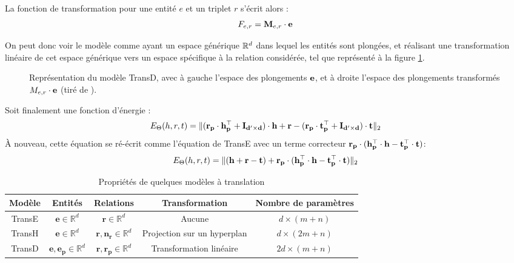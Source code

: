 La fonction de transformation pour une entité $e$ et un triplet $r$ s'écrit alors :
\begin{equation}
    \label{eq:kge-transd-function}
    F_{e, r} = \bf{M}_{e, r} \cdot \bf{e}
\end{equation}

On peut donc voir le modèle comme ayant un espace générique $\R^d$ dans lequel les entités sont plongées, et réalisant une transformation linéaire de cet espace générique vers un espace spécifique à la relation considérée, tel que représenté à la figure \ref{fig:transd-schema}.

\begin{figure}[h]
    \centering
    
    \caption[Principe du modèle TransD]{Représentation du modèle TransD, avec à gauche l'espace des plongements $\bf{e}$, et à droite l'espace des plongements transformés $M_{e, r} \cdot \bf{e}$ (tiré de \cite{transd}).}
    \label{fig:transd-schema}
\end{figure}

Soit finalement une fonction d'énergie :
\begin{equation}
    E_\Theta(h, r, t) = \| (\bf{r_p \cdot h_p^\top + I_{d' \times d}}) \cdot \bf{h} + \mathbf{r} - (\bf{r_p \cdot t_p^\top + I_{d' \times d}}) \cdot \bf{t} \|_2 
\end{equation}
À nouveau, cette équation se ré-écrit comme l'équation de TransE avec un terme correcteur $\bf{r_p} \cdot (\bf{ h_p^\top \cdot h - t_p^\top \cdot t})$:
\begin{equation}
    E_\Theta(h, r, t) = \| (\bf{h + r - t}) + \bf{r_p} \cdot (\bf{ h_p^\top \cdot h - t_p^\top \cdot t}) \|_2 
\end{equation}



\begin{table}[ht]
\caption{Propriétés de quelques modèles à translation}
\centering
\begin{tabular}{|c|c|c|c|c|}
\hline %
Modèle & Entités & Relations & Transformation & Nombre de paramètres\\\hline
TransE & $\mathbf{e} \in \mathbb{R}^d$ & $\mathbf{r} \in \mathbb{R}^d$ & Aucune & $d \times (m + n)$ \\
TransH & $\mathbf{e} \in \mathbb{R}^d$ & $\mathbf{r, n_r} \in \mathbb{R}^d$ & Projection sur un hyperplan & $d \times (2m + n)$ \\
TransD & $\mathbf{e, e_p} \in \mathbb{R}^d$ & $\mathbf{r, r_p} \in \mathbb{R}^d$  & Transformation linéaire & $2d \times (m + n)$ \\\hline
\end{tabular}
\label{tab:transx}
\end{table}

